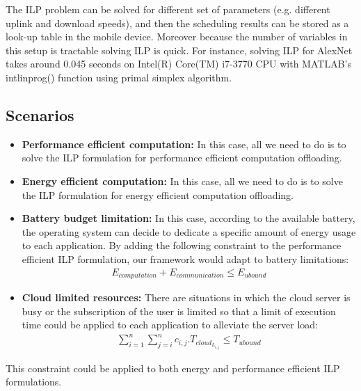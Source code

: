\documentclass[conference,9pt]{IEEEtran}
\begin{document}
The ILP problem can be solved for different set of parameters (e.g. different uplink and download speeds), and then the scheduling results can be stored as a look-up table in the mobile device. Moreover because the number of variables in this setup is tractable solving ILP is quick. For instance, solving ILP for AlexNet takes around 0.045 seconds on Intel(R) Core(TM) i7-3770 CPU with MATLAB\textregistered's intlinprog() function using primal simplex algorithm.
\subsection{Scenarios}
\begin{itemize}
\item\textbf{Performance efficient computation:} In this case, all we need to do is to solve the ILP formulation for performance efficient computation offloading.
\item\textbf{Energy efficient computation:} In this case, all we need to do is to solve the ILP formulation for energy efficient computation offloading.
\item\textbf{Battery budget limitation:} In this case, according to the available battery, the operating system can decide to dedicate a specific amount of energy usage to each application. By adding the following constraint to the performance efficient ILP formulation, our framework would adapt to battery limitations: 
\begin{equation}
      \begin{split}
E_{computation} + E_{communication} \leq E_{ubound}
  \end{split}
\end{equation}
\item\textbf{Cloud limited resources:} There are situations in which the cloud server is busy or the subscription of the user is limited so that a limit of execution time could be applied to each application to alleviate the server load:
\begin{equation}
      \begin{split}
\sum_{i=1}^{n}{\sum_{j=i}^{n}{
c_{i,j}.T_{cloud_{L_{i,j}}}}} \leq T_{ubound}
  \end{split}
\end{equation}
\end{itemize}
This constraint could be applied to both energy and performance efficient ILP formulations.
\end{document}
